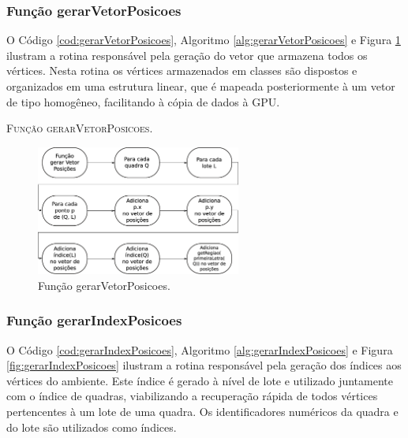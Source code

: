 \newpage

\subsubsection{Função gerarVetorPosicoes}

O Código \ref{cod:gerarVetorPosicoes}, Algoritmo \ref{alg:gerarVetorPosicoes} e Figura \ref{fig:gerarVetorPosicoes} ilustram a rotina responsável pela geração do vetor que armazena todos os vértices. Nesta rotina os vértices armazenados em classes são dispostos e organizados em uma estrutura linear, que é mapeada posteriormente à um vetor de tipo homogêneo, facilitando à cópia de dados à GPU.



\begin{algorithm}[H]
   \SetAlgoLined   
   
   \caption{\textsc{Função gerarVetorPosicoes.}}
   \label{alg:gerarVetorPosicoes}
\end{algorithm}

\begin{figure}[H]
  \centering
  \includegraphics[width=0.6\textwidth]{Figuras/Simula/Fluxos/gerarVetorPosicoes.eps}
  \caption{Função gerarVetorPosicoes.}
  \label{fig:gerarVetorPosicoes}
\end{figure} 

\newpage

\subsubsection{Função gerarIndexPosicoes}

O Código \ref{cod:gerarIndexPosicoes}, Algoritmo \ref{alg:gerarIndexPosicoes} e Figura \ref{fig:gerarIndexPosicoes} ilustram a rotina responsável pela geração dos índices aos vértices do ambiente. Este índice é gerado à nível de lote e utilizado juntamente com o índice de quadras, viabilizando a recuperação rápida de todos vértices pertencentes à um lote de uma quadra. Os identificadores numéricos da quadra e do lote são utilizados como índices. 

